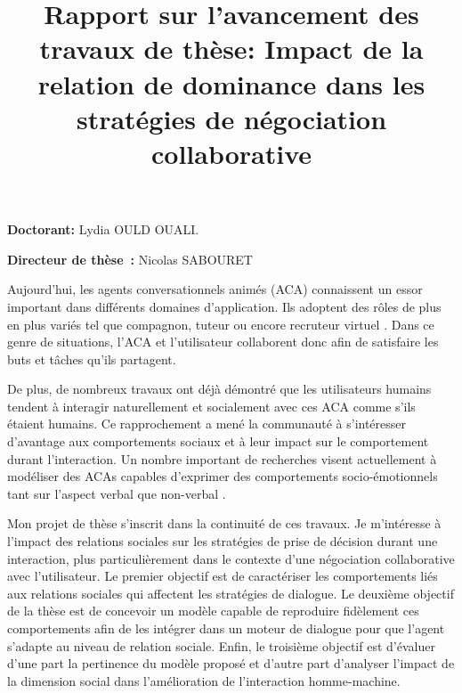 \documentclass  [french] {article}
\begin{document}
		\title{\vskip -10pt Rapport sur l’avancement des travaux de thèse: Impact de la relation de dominance dans les stratégies de négociation collaborative}
				\maketitle
		
	\textbf{Doctorant:} Lydia OULD OUALI.
	\vspace{1em}


	\textbf{Directeur de thèse :} Nicolas SABOURET
	\vspace{1em}
	
	\par Aujourd’hui, les agents conversationnels animés (ACA) connaissent un essor important dans différents domaines d’application. Ils adoptent des rôles de plus en plus variés tel que compagnon, tuteur  ou encore recruteur virtuel \cite{bickmore2005establishing,kerly2008calmsystem}. Dans ce genre de situations, l'ACA et l'utilisateur collaborent donc afin de satisfaire les buts et tâches qu'ils partagent.
	
	De plus, de nombreux travaux ont déjà démontré que les utilisateurs humains tendent à interagir naturellement et socialement avec ces ACA comme s’ils étaient humains. Ce rapprochement a mené la communauté à s'intéresser d'avantage aux comportements sociaux et à leur impact sur le comportement durant l'interaction.  Un nombre important de recherches visent actuellement à modéliser des ACAs capables d'exprimer des comportements socio-émotionnels tant sur l'aspect verbal que non-verbal \cite{callejas2014computational,de2011effect,kidd2005sociable}.
	
	Mon projet de thèse s'inscrit dans la continuité de ces travaux. Je m'intéresse à l'impact des relations sociales sur les stratégies de prise de décision durant une interaction, plus particulièrement dans le contexte d'une négociation collaborative avec l'utilisateur. Le premier objectif est de caractériser les comportements liés aux relations sociales qui affectent les stratégies de dialogue. Le deuxième objectif de la thèse est de concevoir un modèle capable de reproduire fidèlement ces comportements afin de les intégrer dans un moteur de dialogue pour que l'agent s'adapte au niveau de relation sociale. Enfin, le troisième objectif est d'évaluer d'une part la pertinence du modèle proposé et d'autre part d'analyser l'impact de la dimension social dans l'amélioration de l'interaction homme-machine.  
	
\end{document}
